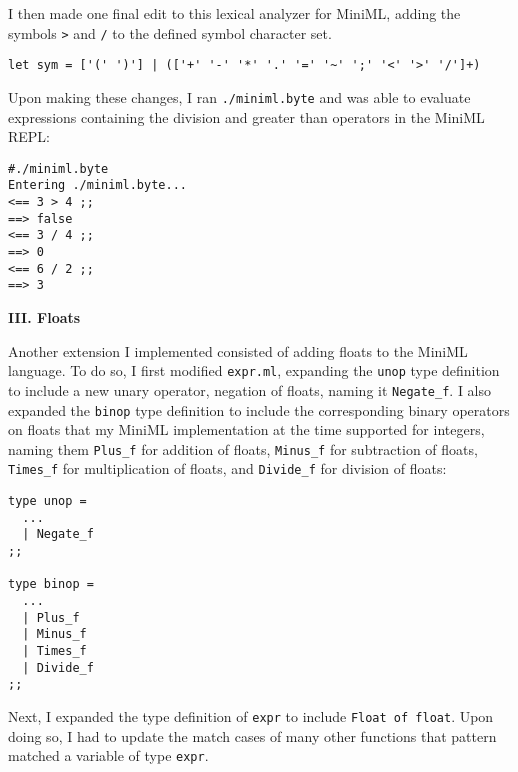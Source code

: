 \documentclass[12pt]{extarticle}
\begin{document}
\vspace{0.3cm}
\normalsize
I then made one final edit to this lexical analyzer for MiniML, adding the symbols \texttt{>} and \texttt{/} to the defined symbol character set.
\vspace{0.3cm}

\footnotesize
\begin{verbatim}
let sym = ['(' ')'] | (['+' '-' '*' '.' '=' '~' ';' '<' '>' '/']+)
\end{verbatim}

\normalsize
\vspace{0.3cm}
Upon making these changes, I ran \texttt{./miniml.byte} and was able to evaluate expressions containing the division and greater than operators in the MiniML REPL:

\footnotesize
{}
\begin{verbatim}
#./miniml.byte
Entering ./miniml.byte...
<== 3 > 4 ;;
==> false
<== 3 / 4 ;;
==> 0
<== 6 / 2 ;;
==> 3
\end{verbatim}

\vspace{0.3cm}
\large \textbf{III. Floats}

\vspace{0.3cm}
\normalsize
Another extension I implemented consisted of adding floats to the MiniML language. To do so, I first modified \texttt{expr.ml}, expanding the \texttt{unop} type definition to include a new unary operator, negation of floats, naming it \texttt{Negate_f}. I also expanded the \texttt{binop} type definition to include the corresponding binary operators on floats that my MiniML implementation at the time supported for integers, naming them \texttt{Plus_f} for addition of floats, \texttt{Minus_f} for subtraction of floats, \texttt{Times_f} for multiplication of floats, and \texttt{Divide_f} for division of floats:

\footnotesize
{}
\begin{verbatim}
type unop =
  ...
  | Negate_f
;;
    
type binop =
  ...
  | Plus_f
  | Minus_f
  | Times_f
  | Divide_f
;;
\end{verbatim}

\vspace{0.3cm}
\normalsize
Next, I expanded the type definition of \texttt{expr} to include \texttt{Float of float}. Upon doing so, I had to update the match cases of many other functions that pattern matched a variable of type \texttt{expr}.
\end{document}
